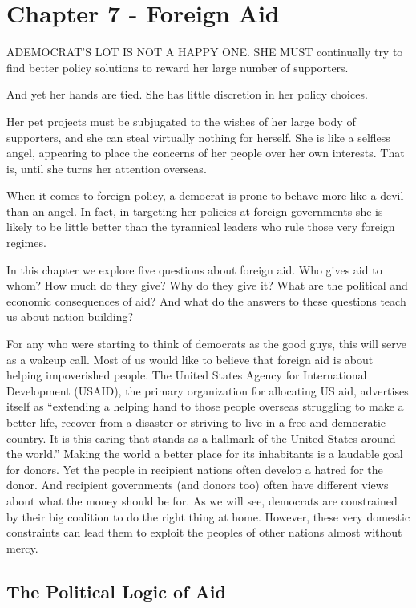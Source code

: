 \documentclass[10pt]{article}
\begin{document}
\section{Chapter 7 - Foreign Aid}

{\large ADEMOCRAT'S LOT IS NOT A HAPPY ONE. SHE MUST continually try to find
better policy solutions to reward her large number of supporters.}

{\large And yet her hands are tied. She has little discretion in her policy
choices.}

{\large Her pet projects must be subjugated to the wishes of her large body of
supporters, and she can steal virtually nothing for herself. She is like a
selfless angel, appearing to place the concerns of her people over her own
interests. That is, until she turns her attention overseas.}

{\large When it comes to foreign policy, a democrat is prone to behave more like
a devil than an angel. In fact, in targeting her policies at foreign governments
she is likely to be little better than the tyrannical leaders who rule those very
foreign regimes.}

{\large In this chapter we explore five questions about foreign aid. Who gives
aid to whom? How much do they give? Why do they give it? What are the political
and economic consequences of aid? And what do the answers to these questions
teach us about nation building?}

{\large For any who were starting to think of democrats as the good guys, this
will serve as a wakeup call. Most of us would like to believe that foreign aid is
about helping impoverished people. The United States Agency for International
Development (USAID), the primary organization for allocating US aid, advertises
itself as ``extending a helping hand to those people overseas struggling to make
a better life, recover from a disaster or striving to live in a free and
democratic country. It is this caring that stands as a hallmark of the United
States around the world.'' Making the world a better place for its inhabitants is
a laudable goal for donors. Yet the people in recipient nations often develop a
hatred for the donor. And recipient governments (and donors too) often have
different views about what the money should be for. As we will see, democrats are
constrained by their big coalition to do the right thing at home. However, these
very domestic constraints can lead them to exploit the peoples of other nations
almost without mercy.}

\subsection{The Political Logic of Aid}
\end{document}
